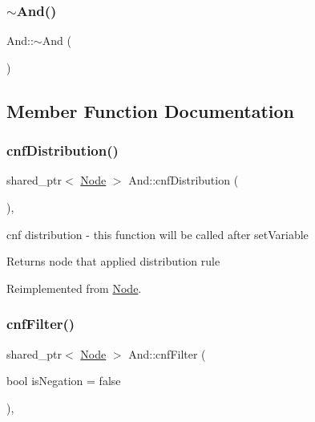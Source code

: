 \subsubsection{\texorpdfstring{$\sim$\+And()}{~And()}}
{\footnotesize\ttfamily And\+::$\sim$\+And (\begin{DoxyParamCaption}{ }\end{DoxyParamCaption})\hspace{0.3cm}{\ttfamily [override]}}



\subsection{Member Function Documentation}
\mbox{\label{class_and_a370c86f44ee17b22208cdbc1f17a7b3f}} 
\subsubsection{\texorpdfstring{cnf\+Distribution()}{cnfDistribution()}}
{\footnotesize\ttfamily shared\+\_\+ptr$<$ \hyperlink{class_node}{Node} $>$ And\+::cnf\+Distribution (\begin{DoxyParamCaption}{ }\end{DoxyParamCaption})\hspace{0.3cm}{\ttfamily [override]}, {\ttfamily [virtual]}}



cnf distribution -\/ this function will be called after set\+Variable 

\begin{DoxyReturn}{Returns}
node that applied distribution rule 
\end{DoxyReturn}


Reimplemented from \hyperlink{class_node_ae68e5138f0c1a6c79912e21bc8f39d48}{Node}.

\mbox{\label{class_and_a18ea23cd682dce93808c34ea0243897f}} 
\subsubsection{\texorpdfstring{cnf\+Filter()}{cnfFilter()}}
{\footnotesize\ttfamily shared\+\_\+ptr$<$ \hyperlink{class_node}{Node} $>$ And\+::cnf\+Filter (\begin{DoxyParamCaption}\item[{bool}]{is\+Negation = {\ttfamily false} }\end{DoxyParamCaption})\hspace{0.3cm}{\ttfamily [override]}, {\ttfamily [virtual]}}



